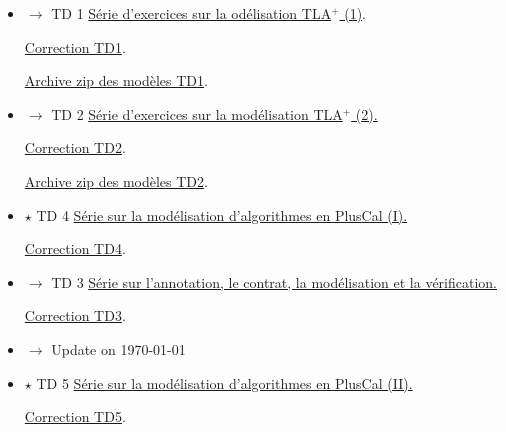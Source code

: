 \documentclass[ 12pt]{article}
\begin{document}
  \begin{itemize}
  \item[] $\longrightarrow$  TD 1 
    \href{http://mery54.github.io/teaching/mvsi/lecturesnotes/newtd1.pdf}{Série d'exercices sur la od\'elisation TLA$^+$  (1)}.

       \href{http://mery54.github.io/teaching/mvsi/lecturesnotes/cnewtd1.pdf}{Correction 
       TD1}.


          \href{http://mery54.github.io/teaching/mvsi/models/td1-models.zip}{Archive 
            zip  des modèles   TD1}.

       
  \item[] $\longrightarrow$   TD 2 
    \href{http://mery54.github.io/teaching/mvsi/lecturesnotes/newtd2.pdf}{Série
      d'exercices sur la mod\'elisation TLA$^+$ (2).}   

          \href{http://mery54.github.io/teaching/mvsi/lecturesnotes/cnewtd2.pdf}{Correction 
            TD2}.

                    \href{http://mery54.github.io/teaching/mvsi/models/td2-models.zip}{Archive 
                      zip  des modèles   TD2}.

       
       
\item[] $\star$ TD 4
    \href{http://mery54.github.io/teaching/mvsi/lecturesnotes/newtd4.pdf}{
      Série sur la mod\'elisation d'algorithmes en PlusCal  (I).}


      \href{http://mery54.github.io/teaching/mvsi/lecturesnotes/cnewtd4.pdf}{Correction 
       TD4}.


     
     
   \item[] $\longrightarrow$  TD 3 
    \href{http://mery54.github.io/teaching/mvsi/lecturesnotes/newtd3.pdf}{
      Série sur l'annotation, le contrat, la  mod\'elisation et  la v\'erification.}

      \href{http://mery54.github.io/teaching/mvsi/lecturesnotes/cnewtd3.pdf}{Correction 
       TD3}.

 \item[] $\longrightarrow$  {Update on \today}

     
\item[] $\star$   TD 5
    \href{http://mery54.github.io/teaching/mvsi/lecturesnotes/newtd5.pdf}{
      Série sur la mod\'elisation d'algorithmes en PlusCal  (II).}


      \href{http://mery54.github.io/teaching/mvsi/lecturesnotes/cnewtd5.pdf}{Correction 
       TD5}.


\end{itemize}
\end{document}
